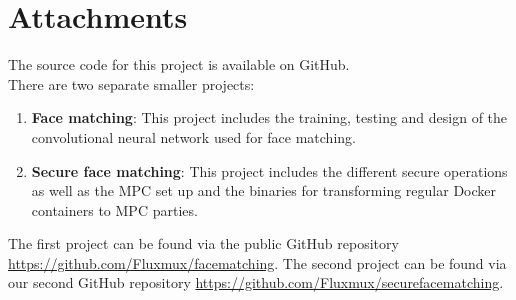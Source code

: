 \chapter{Attachments}
The source code for this project is available on GitHub.\\

There are two separate smaller projects:
\begin{enumerate}
  \item \textbf{Face matching}: This project includes the training, testing and design of the convolutional neural network used for face matching.
  \item \textbf{Secure face matching}: This project includes the different secure operations as well as the MPC set up and the binaries for transforming regular Docker containers to MPC parties.
\end{enumerate}

The first project can be found via the public GitHub repository \url{https://github.com/Fluxmux/facematching}. The second project can be found via our second GitHub repository \url{https://github.com/Fluxmux/securefacematching}.
